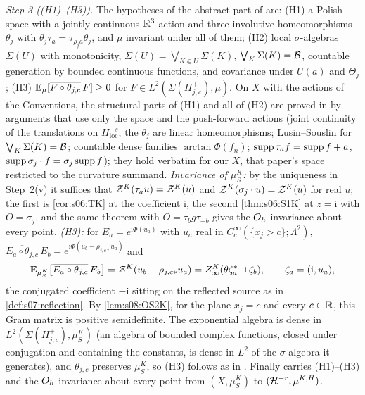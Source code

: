 \emph{Step 3 ((H1)--(H3)).} The hypotheses of the abstract part of \cite{SymPhase} are: (H1) a Polish space with a jointly continuous $\mathbb R^3$-action and three involutive homeomorphisms $\theta_j$ with $\theta_j\tau_a=\tau_{\rho_ja}\theta_j$, and $\mu$ invariant under all of them; (H2) local $\sigma$-algebras $\Sigma(U)$ with monotonicity, $\Sigma(U)=\bigvee_{K\Subset U}\Sigma(K)$, $\bigvee_K\Sigma(K)=\mathcal B$, countable generation by bounded continuous functions, and covariance under $U(a)$ and $\Theta_j$; (H3) $\mathbb E_\mu[\overline{F\circ\theta_{j,c}}\,F]\ge0$ for $F\in L^2(\Sigma(H^+_{j,c}),\mu)$. On $X$ with the actions of the Conventions, the structural parts of (H1) and all of (H2) are proved in \cite[Prop.~10.4]{SymPhase} by arguments that use only the space and the push-forward actions (joint continuity of the translations on $H^{-s}_{\mathrm{loc}}$; the $\theta_j$ are linear homeomorphisms; Lusin--Souslin for $\bigvee_K\Sigma(K)=\mathcal B$; countable dense families $\arctan\Phi(f_n)$; $\operatorname{supp}\tau_af=\operatorname{supp} f+a$, $\operatorname{supp}\sigma_j\cdot f=\sigma_j\operatorname{supp} f$); they hold verbatim for our $X$, that paper's space restricted to the curvature summand. \emph{Invariance of $\mu^K_S$:} by the uniqueness in Step~2(v) it suffices that $\mathcal Z^K(\tau_au)=\mathcal Z^K(u)$ and $\mathcal Z^K(\sigma_j\cdot u)=\mathcal Z^K(u)$ for real $u$; the first is \cref{cor:s06:TK} at the coefficient $\mathrm i$, the second \cref{thm:s06:S1K} at $z=\mathrm i$ with $O=\sigma_j$, and the same theorem with $O=\tau_bg\tau_{-b}$ gives the $O_h$-invariance about every point. \emph{(H3):} for $E_a=e^{\mathrm i\Phi(u_a)}$ with $u_a$ real in $C^\infty_c(\{x_j>c\};\Lambda^2)$, $\overline{E_a\circ\theta_{j,c}}\,E_b=e^{\mathrm i\Phi(u_b-\rho_{j,c*}u_a)}$ and
\[
\mathbb E_{\mu^K_S}\big[\overline{E_a\circ\theta_{j,c}}\,E_b\big]=\mathcal Z^K(u_b-\rho_{j,c*}u_a)=Z^{K}_{\infty}(\theta\zeta_a^*\sqcup\zeta_b),\qquad\zeta_a=(\mathrm i,u_a),
\]
the conjugated coefficient $-\mathrm i$ sitting on the reflected source as in \cref{def:s07:reflection}. By \cref{lem:s08:OS2K}, for the plane $x_j=c$ and every $c\in\mathbb R$, this Gram matrix is positive semidefinite. The exponential algebra is dense in $L^2(\Sigma(H^+_{j,c}),\mu^K_S)$ \cite[Lemma~J.2]{SymPhase} (an algebra of bounded complex functions, closed under conjugation and containing the constants, is dense in $L^2$ of the $\sigma$-algebra it generates), and $\theta_{j,c}$ preserves $\mu^K_S$, so (H3) follows as in \cite[Prop.~10.4]{SymPhase}. Finally \cite[Lemma~10.5(d)]{SymPhase} carries (H1)--(H3) and the $O_h$-invariance about every point from $(X,\mu^K_S)$ to $(\mathcal H^{-r},\mu^{K,H})$.

